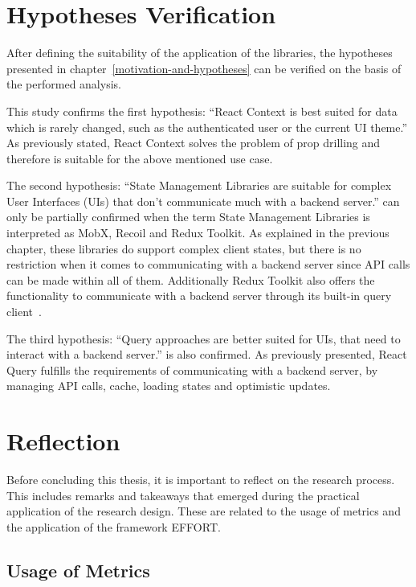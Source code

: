 \hypertarget{hypotheses-verification}{%
    \section{Hypotheses Verification}\label{hypotheses-verification}}

After defining the suitability of the application of the libraries, the
hypotheses presented in chapter~\ref{motivation-and-hypotheses} can be verified
on the basis of the performed analysis.

This study confirms the first hypothesis: ``React Context is
best suited for data which is rarely changed, such as the authenticated
user or the current UI theme.'' As previously stated, React Context
solves the problem of prop drilling and therefore is suitable for the
above mentioned use case.

The second hypothesis: ``State Management Libraries are suitable for
complex User Interfaces (UIs) that don't communicate much with a backend
server.'' can only be partially confirmed when the term State Management
Libraries is interpreted as MobX, Recoil and Redux Toolkit. As explained
in the previous chapter, these libraries do support complex client
states, but there is no restriction when it comes to communicating with
a backend server since API calls can be made within all of them.
Additionally Redux Toolkit also offers the functionality to communicate
with a backend server through its built-in query client~\cite{rtk_query}.

The third hypothesis: ``Query approaches are better suited for UIs, that
need to interact with a backend server.'' is also confirmed. As
previously presented, React Query fulfills the requirements of
communicating with a backend server, by managing API calls, cache,
loading states and optimistic updates.

\hypertarget{reflection}{%
    \section{Reflection}\label{reflection}}

Before concluding this thesis, it is important to reflect on the
research process. This includes remarks and takeaways that emerged
during the practical application of the research design. These are
related to the usage of metrics and the application of the framework
EFFORT\@.

\hypertarget{usage-of-metrics}{%
    \subsection{Usage of Metrics}\label{usage-of-metrics}}

